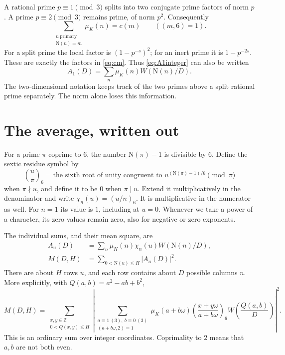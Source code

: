 \documentclass[11pt]{article}
\newcommand{\N}{\mathrm N}
\newcommand{\muk}{\mu_K}
\numberwithin{equation}{section}
\begin{document}
A rational prime $p\equiv1\pmod3$ splits into two conjugate prime
factors of norm $p$. A prime $p\equiv2\pmod3$ remains prime, of norm
$p^2$. Consequently
\begin{equation}\label{eq:normgroup}
 \sum_{\substack{n\ \mathrm{primary}\\\N(n)=m}}\muk(n)=c(m)
 \qquad((m,6)=1).
\end{equation}
For a split prime the local factor is $(1-p^{-s})^2$; for an inert
prime it is $1-p^{-2s}$. These are exactly the factors in
\eqref{eq:cm}. Thus \eqref{eq:A1integer} can also be written
\begin{equation}\label{eq:A1eis}
 A_1(D)=\sum_n\muk(n)W(\N(n)/D).
\end{equation}
The two-dimensional notation keeps track of the two primes above a split
rational prime separately. The norm alone loses this information.

\section{The average, written out}\label{sec:average}

For a prime $\pi$ coprime to $6$, the number $\N(\pi)-1$ is divisible
by $6$. Define the sextic residue symbol by
\begin{equation}\label{eq:sexticdef}
 \left(\frac{u}{\pi}\right)_6
 =\text{the sixth root of unity congruent to }
 u^{(\N(\pi)-1)/6}\pmod\pi
\end{equation}
when $\pi\nmid u$, and define it to be $0$ when $\pi\mid u$.
Extend it multiplicatively in the denominator and write
$\chi_n(u)=(u/n)_6$. It is multiplicative in the numerator as well.
For $n=1$ its value is $1$, including at $u=0$.
Whenever we take a power of a character, its zero values remain zero,
also for negative or zero exponents.

The individual sums, and their mean square, are
\begin{align}
 A_u(D)&=\sum_n\muk(n)\chi_n(u)W(\N(n)/D),\label{eq:Au}\\
 M(D,H)&=\sum_{0<\N(u)\le H}|A_u(D)|^2.\label{eq:M}
\end{align}
There are about $H$ rows $u$, and each row contains about $D$ possible
columns $n$. More explicitly, with $Q(a,b)=a^2-ab+b^2$,
\begin{equation}\label{eq:coordinates}
 M(D,H)=\sum_{\substack{x,y\in\mathbb Z\\0<Q(x,y)\le H}}
 \left|\sum_{\substack{a\equiv1\ (3),\ b\equiv0\ (3)\\(a+b\omega,2)=1}}
 \muk(a+b\omega)
 \left(\frac{x+y\omega}{a+b\omega}\right)_6
 W\left(\frac{Q(a,b)}D\right)\right|^2.
\end{equation}
This is an ordinary sum over integer coordinates. Coprimality to $2$
means that $a,b$ are not both even.
\end{document}
